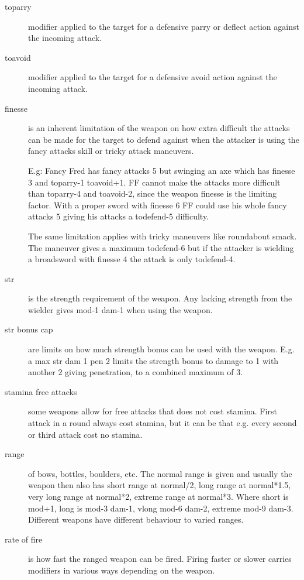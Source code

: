 \begin{description}
\item[toparry] modifier applied to the target for a defensive parry or deflect action against the incoming attack.

\item[toavoid] modifier applied to the target for a defensive avoid action against the incoming attack.

\item[finesse] is an inherent limitation of the weapon on how extra difficult the attacks can be made for the target to defend against when the attacker is using the fancy attacks skill or tricky attack maneuvers.

E.g: Fancy Fred has fancy attacks 5 but swinging an axe which has finesse 3 and toparry-1 toavoid+1. FF cannot make the attacks more difficult than toparry-4 and toavoid-2, since the weapon finesse is the limiting factor. With a proper sword with finesse 6 FF could use his whole fancy attacks 5 giving his attacks a todefend-5 difficulty.

The same limitation applies with tricky maneuvers like roundabout smack. The maneuver gives a maximum todefend-6 but if the attacker is wielding a broadsword with finesse 4 the attack is only todefend-4.

\item[str] is the strength requirement of the weapon. Any lacking strength from the wielder gives mod-1 dam-1 when using the weapon.

\item[str bonus cap] are limits on how much strength bonus can be used with the weapon. E.g. a max str dam 1 pen 2 limits the strength bonus to damage to 1 with another 2 giving penetration, to a combined maximum of 3.

\item[stamina free attacks] some weapons allow for free attacks that does not cost stamina. First attack in a round always cost stamina, but it can be that e.g. every second or third attack cost no stamina.

\item[range] of bows, bottles, boulders, etc. The normal range is given and usually the weapon then also has short range at normal/2, long range at normal*1.5, very long range at normal*2, extreme range at normal*3. Where short is mod+1, long is mod-3 dam-1, vlong mod-6 dam-2, extreme mod-9 dam-3. Different weapons have different behaviour to varied ranges.

\item[rate of fire] is how fast the ranged weapon can be fired. Firing faster or slower carries modifiers in various ways depending on the weapon.


\end{description}
